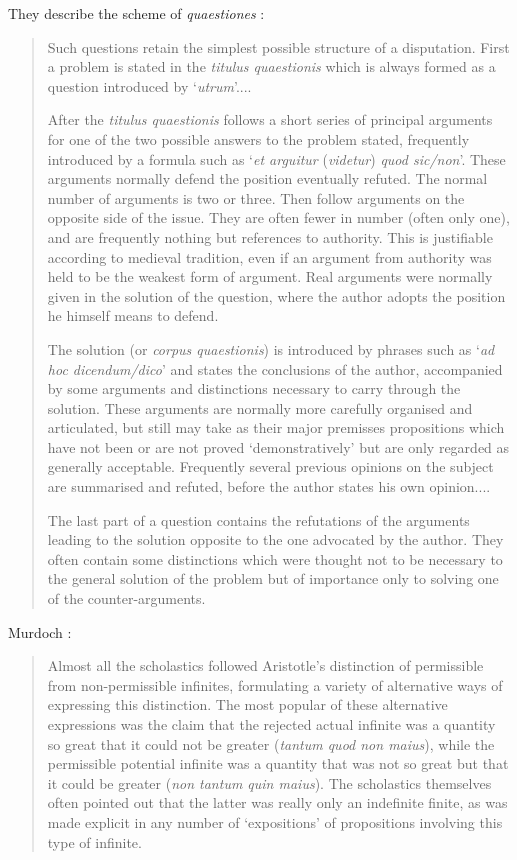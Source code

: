 \documentclass{article}
\theoremstyle{definition}
\begin{document}
 They describe the scheme of {\em quaestiones} \cite[pp.~30--32]{kenny}:
\begin{quote}
Such questions retain the simplest possible structure of a disputation. First a problem is stated in the {\em titulus quaestionis}
which is always formed as a question introduced by `{\em utrum}'....

After the {\em titulus quaestionis} follows a short series of principal arguments for one of the two possible
answers to the problem stated, frequently introduced by a formula such as `{\em et arguitur} ({\em videtur}) {\em quod sic/non}'.
These arguments normally defend the position eventually refuted. The normal number of arguments is two or three. Then follow
arguments on the opposite side of the issue. They are often fewer in number (often only one), and are frequently nothing
but references to authority. This is justifiable according to medieval tradition, even if an argument from authority was held to be
the weakest form of argument. Real arguments were normally given in the solution of the question, where the author
adopts the position he himself means to defend.

The solution (or {\em corpus quaestionis}) is introduced by phrases such as `{\em ad hoc dicendum/dico}' and states the conclusions of the
author, accompanied by some arguments and distinctions necessary to carry through the solution. These arguments are normally
more carefully organised and articulated, but still may take as their major premisses propositions which have not been or are not proved
`demonstratively' but are only regarded as generally acceptable. Frequently several previous opinions on the subject are
summarised and refuted, before the author states his own opinion....

The last part of a question contains the refutations of the arguments leading to the solution opposite to
the one advocated by the author. They often contain some distinctions which were thought not to be necessary to
the general solution of the problem but of importance only to solving one of the counter-arguments.
 \end{quote}


Murdoch \cite[pp.~567--568]{murdoch1982}:

\begin{quote}
Almost all the scholastics followed Aristotle's distinction of permissible from non-permissible infinites, formulating
a variety of alternative ways of expressing this distinction. The most popular of these alternative expressions
was the claim that the rejected actual infinite was a quantity so great that it could not be greater ({\em tantum quod non maius}),
while the permissible potential infinite was a quantity that was not so great but that it could be greater ({\em non tantum
quin maius}). The scholastics themselves often pointed out that the latter was really only an indefinite finite, as was made explicit
in any number of `expositions' of propositions involving this type of infinite.  
\end{quote}
\end{document}
